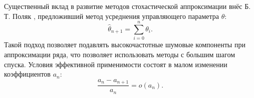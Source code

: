 Существенный вклад в развитие методов стохастической аппроксимации внёс Б. Т. Поляк \cite{polyak1990new},
предложивший метод усреднения управляющего параметра $\theta$:
 \begin{equation}
     \hat{\theta}_{n+1} = \sum_{i=0}^n \theta_i.
     \label{polyak}
 \end{equation}
Такой подход позволяет подавлять высокочастотные шумовые компоненты при аппроксимации ряда, что позволяет использовать 
методы с большим шагом спуска. Условия эффективной применимости состоят в малом изменении коэффициентов $a_n$:
 \begin{equation}
    \frac{a_{n}-a_{n+1}}{a_{n}}=\mathit{o}(a_{n}).
    \label{polyak_assumptions}
 \end{equation}






